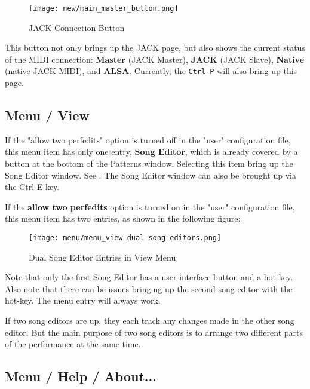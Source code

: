 \begin{figure}[H]
   \centering 
   \texttt{[image: new/main\_master\_button.png]}
   \caption{JACK Connection Button}
   \label{fig:seq64_main_master_button}
\end{figure}

   This button not only brings up the JACK page, but also shows the current
   status of the MIDI connection:
   \textbf{Master} (JACK Master),
   \textbf{JACK} (JACK Slave),
   \textbf{Native} (native JACK MIDI),
   and \textbf{ALSA}.
   Currently, the \texttt{Ctrl-P} will also bring up this page.

\subsection{Menu / View}
\label{subsec:seq64_menu_view}

   If the "allow two perfedits" option is turned off in the "user"
   configuration file, this menu item has only one entry, \textbf{Song Editor}, 
   which is already covered by a button at the bottom of the Patterns
   window.  Selecting this item bring up the Song Editor window.
   See .
   The Song Editor window can also be brought up via the
   Ctrl-E key.

   If the \textbf{allow two perfedits} option is turned on in the "user"
   configuration file, this menu item has two entries, as shown in the
   following figure:

\begin{figure}[H]
   \centering 
   \texttt{[image: menu/menu\_view-dual-song-editors.png]}
   \caption{Dual Song Editor Entries in View Menu}
   \label{fig:seq64_menu_view_song_editors}
\end{figure}

   Note that only the first Song Editor has a user-interface button and
   a hot-key.  Also note that there can be issues bringing up the second
   song-editor with the hot-key.  The menu entry will always work.

   If two song editors are up, they each track any changes made in the other
   song editor.  But the main purpose of two song editors is to arrange two
   different parts of the performance at the same time.

\subsection{Menu / Help / About...}
\label{subsec:seq64_menu_about}

